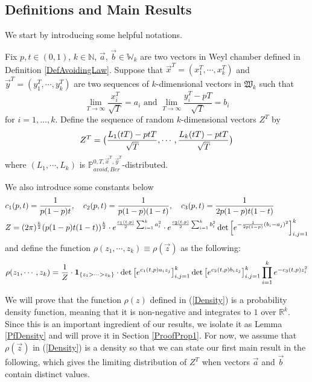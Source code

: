 \subsection{Definitions and Main Results}{\label{DefMainRes}}
We start by introducing some helpful notations.
\begin{definition}\label{DefScaled}
	Fix $p,t\in(0,1)$, $k\in\mathbb{N}$, $\vec{a}$, $\vec{b}\in \mathbb{W}_{k}$ are two vectors in Weyl chamber defined in Definition \ref{DefAvoidingLaw}. Suppose that $\vec{x}^{T}=(x_{1}^{T},\cdots,x_{k}^{T})$ and $\vec{y}^{T}=(y_{1}^{T},\cdots,y_{k}^{T})$ are two sequences of $k$-dimensional vectors in $\mathfrak{W}_{k}$ such that $$\lim_{T\rightarrow\infty}\frac{x_{i}^{T}}{\sqrt{T}}=a_{i} \text{ and } \lim_{T\rightarrow\infty}\frac{y_{i}^{T}-pT}{\sqrt{T}}=b_{i}$$ for $i=1,\dots,k$. Define the sequence of random $k$-dimensional vectors $Z^{T}$ by 
	\begin{align}{\label{ZTandL}}
		\begin{split}
		Z^{T}=\big(\frac{L_{1}(tT)-ptT}{\sqrt{T}},\cdots,\frac{L_{k}(tT)-ptT}{\sqrt{T}}\big)
	\end{split}
	\end{align}
	where $(L_{1},\cdots,L_{k})$ is $\mathbb{P}^{0,T,\vec{x}^{T},\vec{y}^{T}}_{avoid,Ber}$-distributed.
\end{definition}

We also introduce some constants below
\begin{align}{\label{WCconst}}
	\begin{split}
	&c_{1}(p,t)=\frac{1}{p(1-p)t}, \quad c_{2}(p,t)=\frac{1}{p(1-p)(1-t)}, \quad c_{3}(p,t)=\frac{1}{2p(1-p)t(1-t)}\\
	&Z=(2\pi)^{\frac{k}{2}}(p(1-p)t(1-t))^{\frac{k}{2}}\cdot e^{\frac{c_{1}(t,p)}{2}\sum_{i=1}^{k}a_{i}^{2}}\cdot e^{\frac{c_{2}(t,p)}{2}\sum_{i=1}^{k}b_{i}^{2}}\det\left[e^{-\frac{1}{2p(1-p)}(b_{i}-a_{j})^{2}}\right]_{i,j=1}^{k}
	\end{split}
\end{align}
and define the function $\rho(z_{1},\cdots, z_{k})\equiv\rho(\vec{z})$ as the following:
\begin{align}{\label{Density}}
	\rho(z_{1},\cdots,z_{k})=\frac{1}{Z}\cdot \mathbf{1}_{\{z_{1}>\cdots >z_{k}\}}\cdot \det\big[e^{c_{1}(t,p)a_{i}z_{j}}\big]_{i,j=1}^{k}\det\big[e^{c_{2}(t,p)b_{i}z_{j}}\big]_{i,j=1}^{k}\prod_{i=1}^{k}e^{-c_{3}(t,p)z_{i}^{2}}
\end{align}

We will prove that the function $\rho(z)$ defined in (\ref{Density}) is a probability density function, meaning that it is non-negative and integrates to $1$ over $\mathbb{R}^{k}$. Since this is an important ingredient of our results, we isolate it as Lemma \ref{PfDensity} and will prove it in Section \ref{ProofProp1}. For now, we assume that $\rho(\vec{z})$ in (\ref{Density}) is a density so that we can state our first main result in the following, which gives the limiting distribution of $Z^{T}$ when vectors $\vec{a}$ and $\vec{b}$ contain distinct values.

